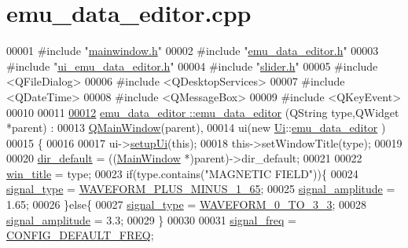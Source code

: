 \hypertarget{a00035_source}{\section{emu\+\_\+data\+\_\+editor.\+cpp}
\label{a00035_source}
}

\begin{DoxyCode}
00001 \textcolor{preprocessor}{#include "\hyperlink{a00039}{mainwindow.h}"}
00002 \textcolor{preprocessor}{#include "\hyperlink{a00036}{emu\_data\_editor.h}"}
00003 \textcolor{preprocessor}{#include "\hyperlink{a00051}{ui\_emu\_data\_editor.h}"}
00004 \textcolor{preprocessor}{#include "\hyperlink{a00025}{slider.h}"}
00005 \textcolor{preprocessor}{#include <QFileDialog>}
00006 \textcolor{preprocessor}{#include <QDesktopServices>}
00007 \textcolor{preprocessor}{#include <QDateTime>}
00008 \textcolor{preprocessor}{#include <QMessageBox>}
00009 \textcolor{preprocessor}{#include <QKeyEvent>}
00010 
00011 
\hypertarget{a00035_source_l00012}{}\hyperlink{a00004_ace57d3f7e3dd136290777006218abca9}{00012} \hyperlink{a00004_ace57d3f7e3dd136290777006218abca9}{emu\_data\_editor ::emu\_data\_editor} (QString type,QWidget *parent) :
00013     \hyperlink{a00010}{QMainWindow}(parent),
00014     ui(new \hyperlink{a00055}{Ui}::\hyperlink{a00004}{emu\_data\_editor} )
00015 \{
00016 
00017     ui->\hyperlink{a00026_a33af8ac054888d9cc0833b699028b690}{setupUi}(\textcolor{keyword}{this});
00018     this->setWindowTitle(type);
00019 
00020     \hyperlink{a00004_aa55b7d8008e31fcc971692b493e7cf34}{dir\_default} = ((\hyperlink{a00006}{MainWindow} *)parent)->dir\_default;
00021 
00022     \hyperlink{a00004_a2abdde44f37258778dcc571e8cc7ed1a}{win\_title} = type;
00023     \textcolor{keywordflow}{if}(type.contains(\textcolor{stringliteral}{"MAGNETIC FIELD"}))\{
00024         \hyperlink{a00004_a070edaec5aee6ba1f5a6866bc32c8ce4}{signal\_type} = \hyperlink{a00034_a0923d3b365a36e1e8c401cec964aa36f}{WAVEFORM\_PLUS\_MINUS\_1\_65};
00025         \hyperlink{a00004_a73dabe63bd74afe2776e8136211dc36e}{signal\_amplitude} = 1.65;
00026     \}\textcolor{keywordflow}{else}\{
00027         \hyperlink{a00004_a070edaec5aee6ba1f5a6866bc32c8ce4}{signal\_type} = \hyperlink{a00034_ae18fed2471b16a8516d721ff60671dd9}{WAVEFORM\_0\_TO\_3\_3};
00028         \hyperlink{a00004_a73dabe63bd74afe2776e8136211dc36e}{signal\_amplitude} = 3.3;
00029     \}
00030 
00031     \hyperlink{a00004_a67039999d520fc483fab521fae5ddde4}{signal\_freq}      = \hyperlink{a00031_a985a153b3edd3d7d638137ae0b9e5e67}{CONFIG\_DEFAULT\_FREQ};

\end{DoxyCode}
